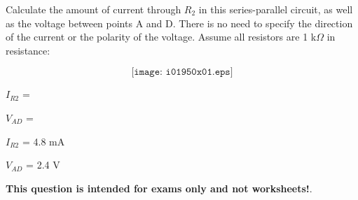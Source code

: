 

Calculate the amount of current through $R_2$ in this series-parallel circuit, as well as the voltage between points A and D.  There is no need to specify the direction of the current or the polarity of the voltage.  Assume all resistors are 1 k$\Omega$ in resistance:

$$\texttt{[image: i01950x01.eps]}$$

$I_{R2}$ = 

\vskip 10pt

$V_{AD}$ = 

\vskip 10pt







$I_{R2}$ = 4.8 mA

\vskip 10pt

$V_{AD}$ = 2.4 V







{\bf This question is intended for exams only and not worksheets!}.


